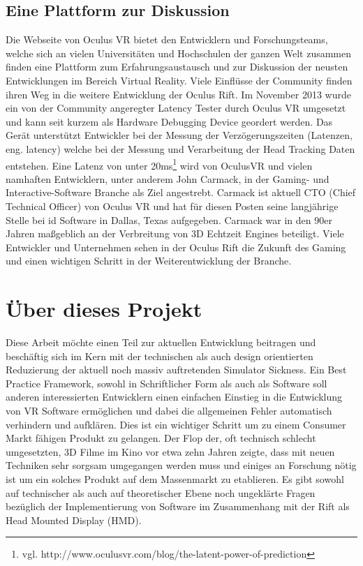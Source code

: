 \documentclass[pagesize, paper=a4, fontsize=12pt,titlepage=true, headings=small, headnosepline, abstractoff, liststotoc, nochapterprefix, plainheadsepline]{scrreprt}
\begin{document}
\subsection{Eine Plattform zur Diskussion}
Die Webseite von Oculus VR bietet den Entwicklern und Forschungsteams, welche sich an vielen Universitäten und Hochschulen der ganzen Welt zusammen finden eine Plattform zum Erfahrungsaustausch und zur Diskussion der neusten Entwicklungen im Bereich Virtual Reality. Viele Einflüsse der Community finden ihren Weg in die weitere Entwicklung der Oculus Rift. Im November 2013 wurde ein von der Community angeregter Latency Tester durch Oculus VR umgesetzt und kann seit kurzem als Hardware Debugging Device geordert werden. Das Gerät unterstützt Entwickler bei der Messung der Verzögerungszeiten (Latenzen, eng. latency) welche bei der Messung und Verarbeitung der Head Tracking Daten entstehen. Eine Latenz von unter 20ms\footnote{vgl. http://www.oculusvr.com/blog/the-latent-power-of-prediction} wird von OculusVR und vielen namhaften Entwicklern, unter anderem John Carmack, in der Gaming- und Interactive-Software Branche als Ziel angestrebt. Carmack ist aktuell CTO (Chief Technical Officer) von Oculus VR und hat für diesen Posten seine langjährige Stelle bei id Software in Dallas, Texas aufgegeben. Carmack war in den 90er Jahren maßgeblich an der Verbreitung von 3D Echtzeit Engines beteiligt. Viele Entwickler und Unternehmen sehen in der Oculus Rift die Zukunft des Gaming und einen wichtigen Schritt in der Weiterentwicklung der Branche.


\section{Über dieses Projekt}
Diese Arbeit möchte einen Teil zur aktuellen Entwicklung beitragen und beschäftig sich im Kern mit der technischen als auch design orientierten Reduzierung der aktuell noch massiv auftretenden Simulator Sickness. Ein Best Practice Framework, sowohl in Schriftlicher Form als auch als Software soll anderen interessierten Entwicklern einen einfachen Einstieg in die Entwicklung von VR Software ermöglichen und dabei die allgemeinen Fehler automatisch verhindern und aufklären. Dies ist ein wichtiger Schritt um zu einem Consumer Markt fähigen Produkt zu gelangen. Der Flop der, oft technisch schlecht umgesetzten, 3D Filme im Kino vor etwa zehn Jahren zeigte, dass mit neuen Techniken sehr sorgsam umgegangen werden muss und einiges an Forschung nötig ist um ein solches Produkt auf dem Massenmarkt zu etablieren. Es gibt sowohl auf technischer als auch auf theoretischer Ebene noch ungeklärte Fragen bezüglich der Implementierung von Software im Zusammenhang mit der Rift als Head Mounted Display (HMD).
\end{document}
